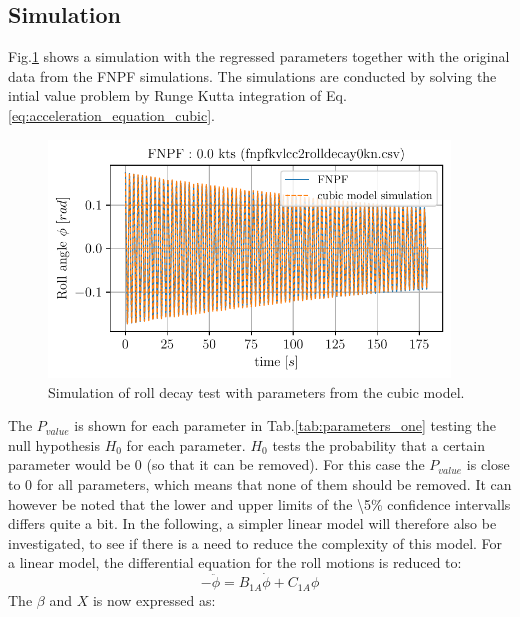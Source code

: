 \subsection*{Simulation}\label{simulation}
Fig.\ref{fig:sim_cubic} shows a simulation with the regressed
parameters together with the original data from the FNPF simulations.
The simulations are conducted by solving the intial value problem by
Runge Kutta integration of
Eq.\ref{eq:acceleration_equation_cubic}.
\begin{figure}[H]
\begin{center}\includegraphics[width = 0.95\textwidth]{figures/sim_cubic.pdf}\end{center}
\vspace{-0.7cm}
\caption{Simulation of roll decay test with parameters from the cubic model.}
\label{fig:sim_cubic}
\end{figure}
The $P_{value}$ is shown for each parameter in
Tab.\ref{tab:parameters_one} testing the null hypothesis $H_0$
for each parameter. $H_0$ tests the probability that a certain
parameter would be 0 (so that it can be removed). For this case the
$P_{value}$ is close to 0 for all parameters, which means that none of
them should be removed.
It can however be noted that the lower and upper limits of the
\textbackslash5\% confidence intervalls differs quite a bit. In the
following, a simpler linear model will therefore also be investigated,
to see if there is a need to reduce the complexity of this model. For a
linear model, the differential equation for the roll motions is reduced
to:
\begin{equation}
- \ddot{\phi} = B_{1A} \dot{\phi} + C_{1A} \phi
\label{eq:Eq(-Derivative(phi(t), (t, 2)), B_1A*Derivative(phi(t), t) + C_1A*phi(t))}
\end{equation}
The $\beta$ and $X$ is now expressed as:
